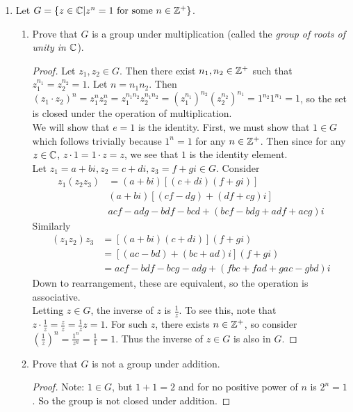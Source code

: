 \begin{enumerate}
\begin{proof}
		\end{proof}
		\item Let $G = \left\{z\in \mathbb{C} | z^n = 1 \text{ for some }n\in\mathbb{Z}^+ \right\}$.
		\begin{enumerate}
			\item Prove that $G$ is a group under multiplication (called the \emph{group of roots of unity in $\mathbb{C}$}).
			\begin{proof}
				Let $z_1, z_2 \in G$.  Then there exist $n_1,n_2\in\mathbb{Z}^+$ such that $z_1^{n_1} = z_2^{n_2} = 1$.  Let $n = n_1n_2$.  Then $(z_1\cdot z_2)^n = z_1^n z_2^n = z_1^{n_1n_2}z_2^{n_1n_2} = (z_1^{n_1})^{n_2}(z_2^{n_2})^{n_1} = 1^{n_2}1^{n_1}=1$, so the set is closed under the operation of multiplication.\\
				We will show that $e=1$ is the identity.  First, we must show that $1\in G$ which follows trivially because $1^n = 1$ for any $n\in \mathbb{Z}^+$.  Then since for any $z\in \mathbb{C}$, $z\cdot 1 = 1\cdot z = z$, we see that $1$ is the identity element.\\
				Let $z_1=a+bi, z_2=c+di, z_3=f+gi \in G$.  Consider 
				\begin{align*}
					z_1(z_2z_3) &= (a+bi)[(c+di)(f+gi)]\\
					& (a+bi)[(cf-dg)+(df+cg)i]\\
					& acf-adg -bdf-bcd+(bcf-bdg+adf+acg)i
				\end{align*}
				Similarly
				\begin{align*}
					(z_1z_2)z_3 &= [(a+bi)(c+di)](f+gi)\\
					&=[(ac-bd)+(bc+ad)i](f+gi)\\
					&=acf-bdf-bcg-adg+(fbc+fad+gac-gbd)i
				\end{align*}
				Down to rearrangement, these are equivalent, so the operation is associative.\\
				Letting $z\in G$, the inverse of $z$ is $\frac{1}{z}$.  To see this, note that $z\cdot\frac{1}{z} = \frac{z}{z} = \frac{1}{z}z = 1$.  For such $z$, there exists $n\in \mathbb{Z}^+$, so consider $\left(\frac{1}{z}\right)^n = \frac{1^n}{z^n} = \frac{1}{1} = 1$.  Thus the inverse of $z\in G$ is also in $G$.
			\end{proof}
			\item Prove that $G$ is not a group under addition.
			\begin{proof}
				Note: $1\in G$, but $1+1 = 2$ and for no positive power of $n$ is $2^n = 1$.  So the group is not closed under addition.
			\end{proof}

\end{enumerate}
\end{enumerate}
